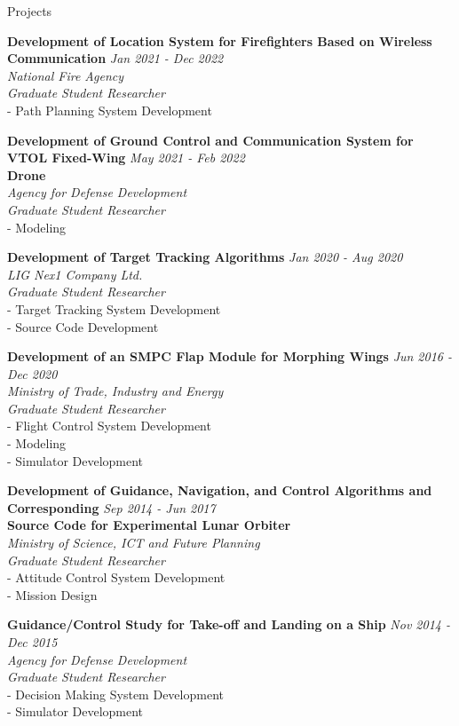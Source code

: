 \documentclass{resume}
\begin{document}
\begin{rSection}{Projects}\normalfont

{\bf Development of Location System for Firefighters Based on Wireless Communication} \hfill {\em Jan 2021 - Dec 2022} 
\\{\textit{ National Fire Agency}}
\\{\textit{ Graduate Student Researcher}}
\\- Path Planning System Development

{\textbf{Development of Ground Control and Communication System for VTOL Fixed-Wing} \hfill {\em May 2021 - Feb 2022} \\ \textbf{Drone}} 
\\{\textit{ Agency for Defense Development}}
\\{\textit{ Graduate Student Researcher}}
\\- Modeling

{\bf Development of Target Tracking Algorithms} \hfill {\em Jan 2020 - Aug 2020} 
\\{\textit{ LIG Nex1 Company Ltd.}}
\\{\textit{ Graduate Student Researcher}}
\\- Target Tracking System Development
\\- Source Code Development

{\bf Development of an SMPC Flap Module for Morphing Wings} \hfill {\em Jun 2016 - Dec 2020} 
\\{\textit{ Ministry of Trade, Industry and Energy}}
\\{\textit{ Graduate Student Researcher}}
\\- Flight Control System Development
\\- Modeling
\\- Simulator Development

{\textbf{Development of Guidance, Navigation, and Control Algorithms and Corresponding} \hfill {\em Sep 2014 - Jun 2017} \\ \textbf{Source Code for Experimental Lunar Orbiter}}  
\\{\textit{ Ministry of Science, ICT and Future Planning}}
\\{\textit{ Graduate Student Researcher}}
\\- Attitude Control System Development
\\- Mission Design

{\bf Guidance/Control Study for Take-off and Landing on a Ship} \hfill {\em Nov 2014 - Dec 2015} 
\\{\textit{ Agency for Defense Development}}
\\{\textit{ Graduate Student Researcher}}
\\- Decision Making System Development
\\- Simulator Development

\end{rSection}
\end{document}

